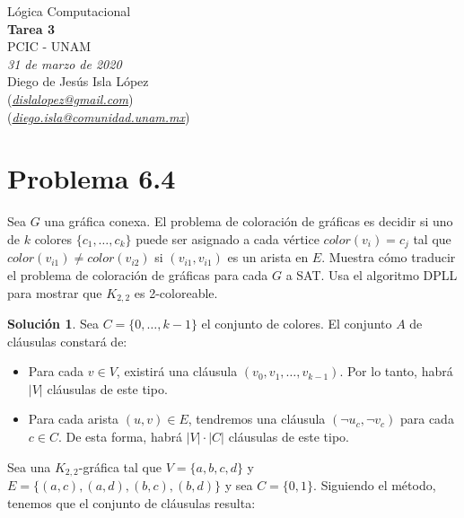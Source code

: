 \documentclass[letterpaper,12pt]{article}
\theoremstyle{definition}
\newtheorem*{solution}{Solución}
\begin{document}
\begin{center}
  {\large Lógica Computacional}\\
  \vspace{0.2cm}
  {\large\bfseries Tarea 3}\\
  \vspace{0.2cm}
  {\large PCIC - UNAM}\\
  \vspace{0.5cm}
  {\itshape 31 de marzo de 2020}\\
  \vspace{0.5cm}
  Diego de Jesús Isla López\\
  (\href{mailto:dislalopez@gmail.com}{\itshape dislalopez@gmail.com})\\
  (\href{mailto:diego.isla@comunidad.unam.mx}{\itshape diego.isla@comunidad.unam.mx})\\
\end{center}


\section*{Problema 6.4}

Sea \(G\) una gráfica conexa. El problema de coloración de gráficas es decidir si uno de \(k\) colores \(\{c_1,\ldots, c_k\}\) puede ser asignado a cada vértice \(color(v_i) = c_j\) tal que \(color(v_{i1}) \neq color(v_{i2})\) si \((v_{i1}, v_{i1})\) es un arista en \(E\). Muestra cómo traducir el problema de coloración de gráficas para cada \(G\) a SAT. Usa el algoritmo DPLL para mostrar que \(K_{2,2}\) es 2-coloreable.

\begin{solution}
  Sea \(C = \{0,\ldots,k-1\}\) el conjunto de colores. El conjunto \(A\) de cláusulas constará de:
  \begin{itemize}
    \item Para cada \(v \in V\), existirá una cláusula \( (v_0, v_1,\ldots,v_{k-1}) \). Por lo tanto, habrá \(|V|\) cláusulas de este tipo.
    \item Para cada arista \( (u,v) \in E\), tendremos una cláusula \( (\neg u_c, \neg v_c) \) para cada \(c \in C \). De esta forma, habrá \( |V| \cdot |C| \) cláusulas de este tipo.
  \end{itemize}
\end{solution}

Sea una \(K_{2,2}\)-gráfica tal que \(V = \{a,b,c,d\}\) y \(E = \{(a,c),(a,d),(b,c),(b,d)\} \) y sea \(C = \{0,1\}\). Siguiendo el método, tenemos que el conjunto de cláusulas resulta:
\end{document}
